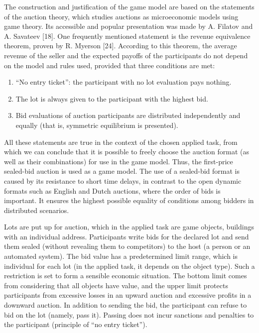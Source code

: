 \documentclass[
]{ceurart}
\begin{document}
The construction and justification of the game model are based on the statements of the auction theory, which studies auctions as microeconomic models using game theory. Its accessible and popular presentation was made by A. Filatov and A. Savateev [18]. One frequently mentioned statement is the revenue equivalence theorem, proven by R. Myerson [24]. According to this theorem, the average revenue of the seller and the expected payoffs of the participants do not depend on the model and rules used, provided that three conditions are met:
\begin{enumerate}
\item ``No entry ticket'': the participant with no lot evaluation pays nothing.
\item The lot is always given to the participant with the highest bid.
\item Bid evaluations of auction participants are distributed independently and equally (that is, symmetric equilibrium is presented).
\end{enumerate}

All these statements are true in the context of the chosen applied task, from which we can conclude that it is possible to freely choose the auction format (as well as their combinations) for use in the game model. Thus, the first-price sealed-bid auction is used as a game model. The use of a sealed-bid format is caused by its resistance to short time delays, in contrast to the open dynamic formats such as English and Dutch auctions, where the order of bids is important. It ensures the highest possible equality of conditions among bidders in distributed scenarios.

Lots are put up for auction, which in the applied task are game objects, buildings with an individual address. Participants write bids for the declared lot and send them sealed (without revealing them to competitors) to the host (a person or an automated system).
The bid value has a predetermined limit range, which is individual for each lot (in the applied task, it depends on the object type). Such a restriction is set to form a sensible economic situation. The bottom limit comes from considering that all objects have value, and the upper limit protects participants from excessive losses in an upward auction and excessive profits in a downward auction.
In addition to sending the bid, the participant can refuse to bid on the lot (namely, pass it). Passing does not incur sanctions and penalties to the participant (principle of ``no entry ticket'').
\end{document}
